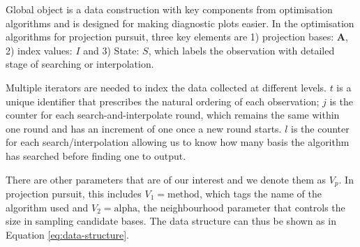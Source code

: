 \documentclass[12pt]{article}
\begin{document}
Global object is a data construction with key components from
optimisation algorithms and is designed for making diagnostic plots
easier. In the optimisation algorithms for projection pursuit, three key
elements are 1) projection bases: \(\mathbf{A}\), 2) index values: \(I\)
and 3) State: \(S\), which labels the observation with detailed stage of
searching or interpolation.

Multiple iterators are needed to index the data collected at different
levels. \(t\) is a unique identifier that prescribes the natural
ordering of each observation; \(j\) is the counter for each
search-and-interpolate round, which remains the same within one round
and has an increment of one once a new round starts. \(l\) is the
counter for each search/interpolation allowing us to know how many basis
the algorithm has searched before finding one to output.

There are other parameters that are of our interest and we denote them
as \emph{\(V_{p}\)}. In projection pursuit, this includes
\(V_1 = \text{method}\), which tags the name of the algorithm used and
\(V_2 = \text{alpha}\), the neighbourhood parameter that controls the
size in sampling candidate bases. The data structure can thus be shown
as in Equation \ref{eq:data-structure}.
\end{document}
